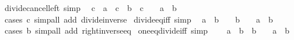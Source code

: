\begin{isabellebody}
\endisatagproof
{\isafoldproof}%
%
\isadelimproof
\isanewline
%
\endisadelimproof
\isanewline
{}\isamarkupfalse%
\ divide{\isacharunderscore}{\kern0pt}cancel{\isacharunderscore}{\kern0pt}left\ {\isacharbrackleft}{\kern0pt}simp{\isacharbrackright}{\kern0pt}{\isacharcolon}{\kern0pt}\isanewline
\ \ {\isachardoublequoteopen}c\ {\isacharslash}{\kern0pt}\ a\ {\isacharequal}{\kern0pt}\ c\ {\isacharslash}{\kern0pt}\ b\ {\isasymlongleftrightarrow}\ c\ {\isacharequal}{\kern0pt}\ {}\ {\isasymor}\ a\ {\isacharequal}{\kern0pt}\ b{\isachardoublequoteclose}\isanewline
%
\isadelimproof
\ \ %
\endisadelimproof
%
\isatagproof
{}\isamarkupfalse%
\ {\isacharparenleft}{\kern0pt}cases\ {\isachardoublequoteopen}c{\isacharequal}{\kern0pt}{}{\isachardoublequoteclose}{\isacharparenright}{\kern0pt}\ {\isacharparenleft}{\kern0pt}simp{\isacharunderscore}{\kern0pt}all\ add{\isacharcolon}{\kern0pt}\ divide{\isacharunderscore}{\kern0pt}inverse{\isacharparenright}{\kern0pt}%
\endisatagproof
{\isafoldproof}%
%
\isadelimproof
\isanewline
%
\endisadelimproof
\isanewline
{}\isamarkupfalse%
\ divide{\isacharunderscore}{\kern0pt}eq{\isacharunderscore}{\kern0pt}{}{\isacharunderscore}{\kern0pt}iff\ {\isacharbrackleft}{\kern0pt}simp{\isacharbrackright}{\kern0pt}{\isacharcolon}{\kern0pt}\isanewline
\ \ {\isachardoublequoteopen}a\ {\isacharslash}{\kern0pt}\ b\ {\isacharequal}{\kern0pt}\ {}\ {\isasymlongleftrightarrow}\ b\ {\isasymnoteq}\ {}\ {\isasymand}\ a\ {\isacharequal}{\kern0pt}\ b{\isachardoublequoteclose}\isanewline
%
\isadelimproof
\ \ %
\endisadelimproof
%
\isatagproof
{}\isamarkupfalse%
\ {\isacharparenleft}{\kern0pt}cases\ {\isachardoublequoteopen}b{\isacharequal}{\kern0pt}{}{\isachardoublequoteclose}{\isacharparenright}{\kern0pt}\ {\isacharparenleft}{\kern0pt}simp{\isacharunderscore}{\kern0pt}all\ add{\isacharcolon}{\kern0pt}\ right{\isacharunderscore}{\kern0pt}inverse{\isacharunderscore}{\kern0pt}eq{\isacharparenright}{\kern0pt}%
\endisatagproof
{\isafoldproof}%
%
\isadelimproof
\isanewline
%
\endisadelimproof
\isanewline
{}\isamarkupfalse%
\ one{\isacharunderscore}{\kern0pt}eq{\isacharunderscore}{\kern0pt}divide{\isacharunderscore}{\kern0pt}iff\ {\isacharbrackleft}{\kern0pt}simp{\isacharbrackright}{\kern0pt}{\isacharcolon}{\kern0pt}\isanewline
\ \ {\isachardoublequoteopen}{}\ {\isacharequal}{\kern0pt}\ a\ {\isacharslash}{\kern0pt}\ b\ {\isasymlongleftrightarrow}\ b\ {\isasymnoteq}\ {}\ {\isasymand}\ a\ {\isacharequal}{\kern0pt}\ b{\isachardoublequoteclose}\isanewline

\end{isabellebody}
